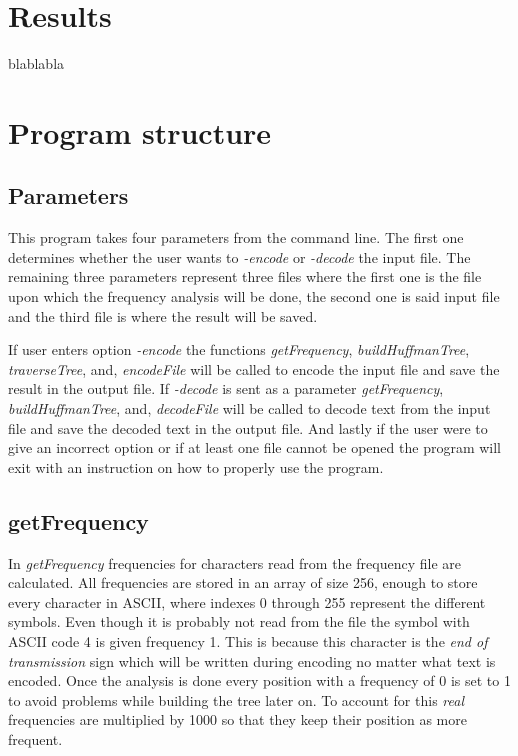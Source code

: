 \documentclass[a4paper,11pt,twoside]{article}
\begin{document}
\section{Results}
blablabla

\section{Program structure}
\subsection{Parameters}
This program takes four parameters from the command line. The first one determines whether the 
user wants to \emph{-encode} or \emph{-decode} the input file. The remaining three parameters represent 
three files where the first one is the file upon which the frequency analysis will be done, the second one is said 
input file and the third file is where the result will be saved. 

If user enters option \emph{-encode} the functions \emph{getFrequency}, \emph{buildHuffmanTree}, \emph{traverseTree}, and, \emph{encodeFile} will be called to encode the input file and save the result in the output file. If \emph{-decode} is sent as a parameter \emph{getFrequency}, \emph{buildHuffmanTree}, and, \emph{decodeFile} will be called to decode text from the input file and save the decoded text in the output file. And lastly if the user were to give an incorrect option or if at least one file cannot be opened the program will exit with an instruction on how to properly use the program.

\subsection{getFrequency}
In \emph{getFrequency}  frequencies for characters read from the frequency file are calculated.
All frequencies are stored in an array of size 256, enough to store every character in ASCII, where indexes 0 through 255 
represent the different symbols. Even though it is probably not read from the file the symbol with ASCII code 4 is given frequency 1. This is because this character is the \emph{end of transmission} sign which will be written during encoding no matter what text is encoded. Once the analysis is done every position with a frequency of 0 is set to 1 to avoid problems while
building the tree later on. To account for this \emph{real} frequencies are multiplied by 1000 so that they keep their position as more frequent.
\end{document}
